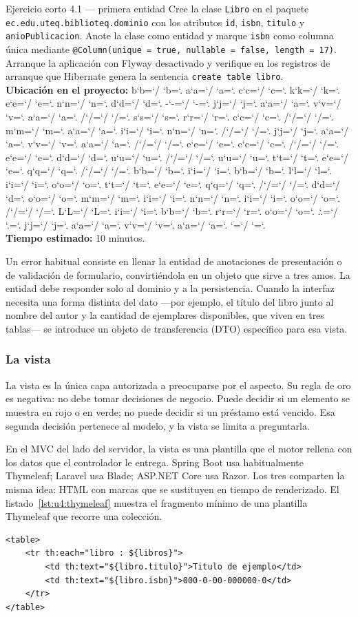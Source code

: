 \documentclass[11pt,a4paper,openany]{book}
\newcommand{\ruta}[1]{{\ttfamily\small\rutaaux #1\relax}}
\def\rutaaux{\futurelet\next\rutapaso}
\def\rutapaso{%
	\ifx\next\relax \let\sig\relax
	\else \let\sig\rutaimprime \fi \sig}
\def\rutaimprime#1{%
	#1\ifnum`#1=`/ \allowbreak\fi
	\ifnum`#1=`. \allowbreak\fi
	\rutaaux}
\begin{document}
\begin{cajaejercicio}{Ejercicio corto 4.1 --- primera entidad}
	Cree la clase \texttt{Libro} en el paquete \texttt{ec.edu.uteq.biblioteq.dominio} con los atributos \texttt{id}, \texttt{isbn}, \texttt{titulo} y \texttt{anioPublicacion}. Anote la clase como entidad y marque \texttt{isbn} como columna única mediante \texttt{@Column(unique = true, nullable = false, length = 17)}. Arranque la aplicación con Flyway desactivado y verifique en los registros de arranque que Hibernate genera la sentencia \texttt{create table libro}.\\[3pt]
	\textbf{Ubicación en el proyecto:} \ruta{backend-java/src/main/java/ec/edu/uteq/biblioteq/dominio/Libro.java}\\[3pt]
	\textbf{Tiempo estimado:} 10 minutos.
\end{cajaejercicio}

Un error habitual consiste en llenar la entidad de anotaciones de presentación o de validación de formulario, convirtiéndola en un objeto que sirve a tres amos. La entidad debe responder solo al dominio y a la persistencia. Cuando la interfaz necesita una forma distinta del dato ---por ejemplo, el título del libro junto al nombre del autor y la cantidad de ejemplares disponibles, que viven en tres tablas--- se introduce un objeto de transferencia (DTO) específico para esa vista.

\subsubsection{La vista}

La vista es la única capa autorizada a preocuparse por el aspecto. Su regla de oro es negativa: no debe tomar decisiones de negocio. Puede decidir si un elemento se muestra en rojo o en verde; no puede decidir si un préstamo está vencido. Esa segunda decisión pertenece al modelo, y la vista se limita a preguntarla.

En el MVC del lado del servidor, la vista es una plantilla que el motor rellena con los datos que el controlador le entrega. Spring Boot usa habitualmente Thymeleaf; Laravel usa Blade; ASP.NET Core usa Razor. Los tres comparten la misma idea: HTML con marcas que se sustituyen en tiempo de renderizado. El listado~\ref{lst:u4:thymeleaf} muestra el fragmento mínimo de una plantilla Thymeleaf que recorre una colección.

\begin{lstlisting}[style=html,caption={Fragmento minimo de plantilla Thymeleaf que itera una coleccion.},label={lst:u4:thymeleaf}]
<table>
	<tr th:each="libro : ${libros}">
		<td th:text="${libro.titulo}">Titulo de ejemplo</td>
		<td th:text="${libro.isbn}">000-0-00-000000-0</td>
	</tr>
</table>
\end{lstlisting}
\end{document}
